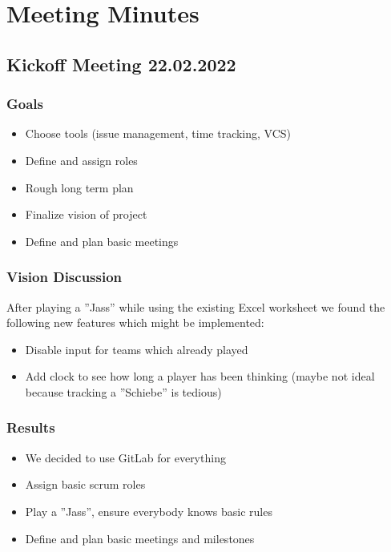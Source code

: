 \chapter{Meeting Minutes}


\section{Kickoff Meeting 22.02.2022}

\subsection{Goals}
\begin{itemize}
    \item Choose tools (issue management, time tracking, VCS)
    \item Define and assign roles
    \item Rough long term plan
    \item Finalize vision of project
    \item Define and plan basic meetings
\end{itemize}

\subsection{Vision Discussion}

After playing a ''Jass'' while using the existing Excel worksheet we found the following new features which might be implemented:

\begin{itemize}
    \item Disable input for teams which already played
    \item Add clock to see how long a player has been thinking (maybe not ideal because tracking a ''Schiebe'' is tedious)
\end{itemize}

\subsection{Results}
\begin{itemize}
    \item We decided to use GitLab for everything
    \item Assign basic scrum roles
    \item Play a ''Jass'', ensure everybody knows basic rules
    \item Define and plan basic meetings and milestones
\end{itemize}



